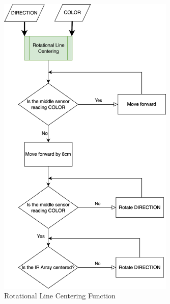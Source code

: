 \documentclass[12pt]{report}
\begin{document}
\begin{figure}[H]
    \centering
    \includegraphics[width=0.75\textwidth]{Images/flowchart/rotational_line_centering.pdf}
    \caption{Rotational Line Centering Function}
    \label{fig:fc:rotational-line-centering}
\end{figure}
\end{document}
